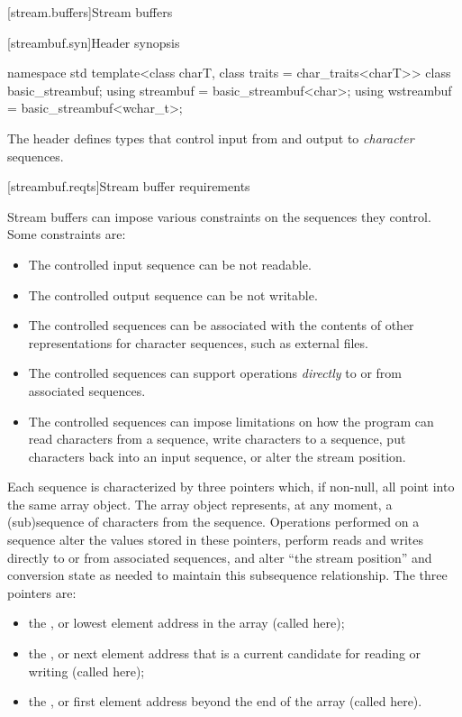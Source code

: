[stream.buffers]{Stream buffers}

[streambuf.syn]{Header  synopsis}

%
%
%
%
%
\begin{codeblock}
namespace std {
  template<class charT, class traits = char_traits<charT>>
    class basic_streambuf;
  using streambuf  = basic_streambuf<char>;
  using wstreambuf = basic_streambuf<wchar_t>;
}
\end{codeblock}

\pnum
The header 
defines types that control input from and output to
\textit{character} sequences.

[streambuf.reqts]{Stream buffer requirements}

\pnum
Stream buffers can impose various constraints on the sequences they control.
Some constraints are:
\begin{itemize}
\item
The controlled input sequence can be not readable.
\item
The controlled output sequence can be not writable.
\item
The controlled sequences can be associated with the contents of other
representations for character sequences, such as external files.
\item
The controlled sequences can support operations
\textit{directly}
to or from associated sequences.
\item
The controlled sequences can impose limitations on how the program can
read characters from a sequence,
write characters to a sequence,
put characters back into an input sequence, or
alter the stream position.
\end{itemize}

\pnum
Each sequence is characterized by three pointers which, if non-null,
all point into the same
array object.
The array object represents, at any moment,
a (sub)sequence of characters from the sequence.
Operations performed on a sequence alter the values stored in these pointers,
perform reads and writes directly to or from associated sequences, and
alter ``the stream position'' and conversion state as needed to
maintain this subsequence relationship.
The three pointers are:
\begin{itemize}
\item
the
,
or lowest element address in the array
(called  here);
\item
the
,
or next element address that is a current
candidate for reading or writing (called  here);
\item
the
,
or first element address beyond the end of
the array (called  here).
\end{itemize}

